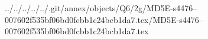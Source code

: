 ../../../../../.git/annex/objects/Q6/2g/MD5E-s4476--007602f535bf06bd0fcbb1c24bcb1da7.tex/MD5E-s4476--007602f535bf06bd0fcbb1c24bcb1da7.tex
